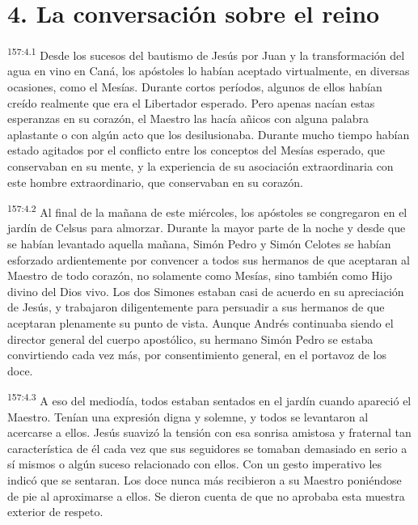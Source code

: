\section*{4. La conversación sobre el reino}
\par
\textsuperscript{157:4.1} Desde los sucesos del bautismo de Jesús por Juan y la transformación del agua en vino en Caná, los apóstoles lo habían aceptado virtualmente, en diversas ocasiones, como el Mesías. Durante cortos períodos, algunos de ellos habían creído realmente que era el Libertador esperado. Pero apenas nacían estas esperanzas en su corazón, el Maestro las hacía añicos con alguna palabra aplastante o con algún acto que los desilusionaba. Durante mucho tiempo habían estado agitados por el conflicto entre los conceptos del Mesías esperado, que conservaban en su mente, y la experiencia de su asociación extraordinaria con este hombre extraordinario, que conservaban en su corazón.

\par
\textsuperscript{157:4.2} Al final de la mañana de este miércoles, los apóstoles se congregaron en el jardín de Celsus para almorzar. Durante la mayor parte de la noche y desde que se habían levantado aquella mañana, Simón Pedro y Simón Celotes se habían esforzado ardientemente por convencer a todos sus hermanos de que aceptaran al Maestro de todo corazón, no solamente como Mesías, sino también como Hijo divino del Dios vivo. Los dos Simones estaban casi de acuerdo en su apreciación de Jesús, y trabajaron diligentemente para persuadir a sus hermanos de que aceptaran plenamente su punto de vista. Aunque Andrés continuaba siendo el director general del cuerpo apostólico, su hermano Simón Pedro se estaba convirtiendo cada vez más, por consentimiento general, en el portavoz de los doce.

\par
\textsuperscript{157:4.3} A eso del mediodía, todos estaban sentados en el jardín cuando apareció el Maestro. Tenían una expresión digna y solemne, y todos se levantaron al acercarse a ellos. Jesús suavizó la tensión con esa sonrisa amistosa y fraternal tan característica de él cada vez que sus seguidores se tomaban demasiado en serio a sí mismos o algún suceso relacionado con ellos. Con un gesto imperativo les indicó que se sentaran. Los doce nunca más recibieron a su Maestro poniéndose de pie al aproximarse a ellos. Se dieron cuenta de que no aprobaba esta muestra exterior de respeto.

